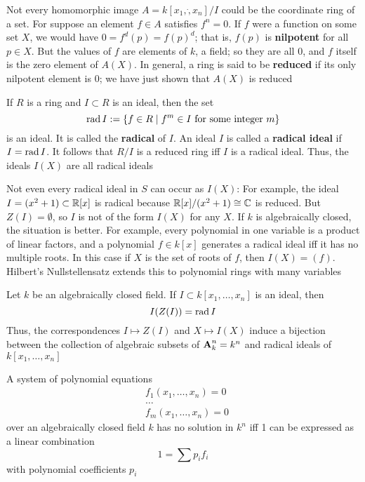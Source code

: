 \documentclass[11pt]{article}
\begin{document}
Not every homomorphic image \(A=k[x_1,\dot,x_n]/I\) could be the coordinate
ring of a set. For suppose an element \(f\in A\) satisfies \(f^n=0\). If
\(f\) were a function on some set \(X\), we would have \(0=f^d(p)=f(p)^d\);
that is, \(f(p)\) is \textbf{nilpotent} for all \(p\in X\). But the values of \(f\)
are elements of \(k\), a field; so they are all 0, and \(f\) itself is the
zero element of \(A(X)\). In general, a ring is said to be \textbf{reduced} if its
only nilpotent element is 0; we have just shown that \(A(X)\) is reduced

If \(R\) is a ring and \(I\subset R\) is an ideal, then the set
\begin{equation*}
\operatorname{rad} I:=\{f\in R\mid f^m\in I\text{ for some integer }m\}
\end{equation*}
is an ideal. It is called the \textbf{radical} of \(I\). An ideal \(I\) is called a
\textbf{radical ideal} if \(I=\operatorname{rad} I\). It follows that \(R/I\) is a reduced ring iff
\(I\) is a radical ideal. Thus, the ideals \(I(X)\) are all radical ideals

Not even every radical ideal in \(S\) can occur as \(I(X)\): For example, the
ideal \(I=(x^2+1)\subset \mathbb{R}[x]\) is radical because \(\mathbb{R}[x]/(x^2+1)\cong\mathbb{C}\)
is reduced. But \(Z(I)=\emptyset\), so \(I\) is not of the form \(I(X)\) for
any \(X\). If \(k\) is algebraically closed, the situation is better. For
example, every polynomial in one variable is a product of linear factors, and
a polynomial \(f\in k[x]\) generates a radical ideal iff it has no multiple
roots. In this case if \(X\) is the set of roots of \(f\), then \(I(X)=(f)\).
Hilbert's Nullstellensatz extends this to polynomial rings with many
variables
\begin{theorem}[Nullstellensatz]
Let \(k\) be an algebraically closed field. If \(I\subset k[x_1,\dots,x_n]\)
is an ideal, then
\begin{equation*}
I(Z(I))=\operatorname{rad} I
\end{equation*}
Thus, the correspondences \(I\mapsto Z(I)\) and \(X\mapsto I(X)\) induce a
bijection between the collection of algebraic subsets of \(\operatorname{\textbf{A}}^n_k=k^n\) and
radical ideals of \(k[x_1,\dots,x_n]\)
\end{theorem}

\begin{corollary}[]
A system of polynomial equations
\begin{align*}
&f_1(x_1,\dots,x_n)=0\\
&\dots\\
&f_m(x_1,\dots,x_n)=0
\end{align*}
over an algebraically closed field \(k\) has no solution in \(k^n\) iff 1 can
be expressed as a linear combination
\begin{equation*}
1=\sum p_if_i
\end{equation*}
with polynomial coefficients \(p_i\)
\end{corollary}
\end{document}
